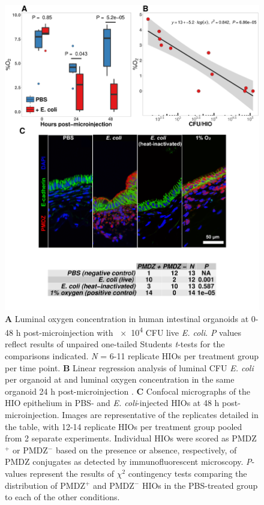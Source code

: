 \documentclass[9pt,lineo]{elife}
\begin{document}
\begin{figure}
\begin{fullwidth}
\centering
\includegraphics[width=0.90\linewidth]{./figures/figure4/figure4_multipanel.pdf}
\caption{\textbf{A} Luminal oxygen concentration in human intestinal organoids at 0-48 h post-microinjection with \num{e4} CFU live \textit{E. coli}. \textit{P} values reflect results of unpaired one-tailed Students \textit{t}-tests for the comparisons indicated. \textit{N} = 6-11 replicate HIOs per treatment group per time point. \textbf{B} Linear regression analysis of luminal CFU \textit{E. coli} per organoid at and luminal oxygen concentration in the same organoid 24 h post-microinjection . \textbf{C} Confocal micrographs of the HIO epithelium in PBS- and \textit{E. coli}-injected HIOs at 48 h post-microinjection. Images are representative of the replicates detailed in the table, with 12-14 replicate HIOs per treatment group pooled from 2 separate experiments. Individual HIOs were scored as PMDZ$^{+}$ or PMDZ$^{-}$ based on the presence or absence, respectively, of PMDZ conjugates as detected by immunofluorescent microscopy. \textit{P}-values represent the results of $\chi{}^{2}$ contingency tests comparing the distribution of PMDZ$^{+}$ and PMDZ$^{-}$ HIOs in the PBS-treated group to each of the other conditions.}
\label{fig:fullwidth}
\end{fullwidth}
\end{figure}
\end{document}
